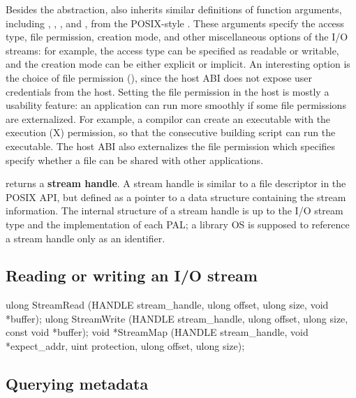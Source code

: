 Besides the abstraction,
also inherits similar definitions of function arguments,
including , , , and ,
from the POSIX-style .
These arguments specify the access type, file permission, creation mode, and other miscellaneous options of the I/O streams:
for example, the access type can be specified as readable or writable,
and the creation mode can be either explicit or implicit.
An interesting option is the choice of file permission (), since the host ABI does not expose user credentials
from the host.
Setting the file permission in the host
is mostly a usability feature: 
an application can run more smoothly if some file permissions are externalized.
For example, a compilor can create an executable with the execution (X) permission, so that the consecutive building script can run the executable.
The host ABI also externalizes the file permission
which specifies specify whether a file can be shared with other applications.


 returns a {\bf stream handle}. A stream handle is similar to a file descriptor in the POSIX API,
but defined as a pointer to a data structure containing the stream information.
The internal structure of a stream handle is up to the I/O stream type and the implementation of each PAL;
a library OS is supposed to reference a stream handle
only as an identifier.




\subsection*{Reading or writing an I/O stream}



\begin{paldef}
ulong StreamRead  (HANDLE stream_handle, ulong offset,
                   ulong size, void *buffer);
ulong StreamWrite (HANDLE stream_handle, ulong offset,
                   ulong size, const void *buffer);
void *StreamMap   (HANDLE stream_handle,
                   void *expect_addr, uint protection,
                   ulong offset, ulong size);
\end{paldef}










\subsection*{Querying metadata}

